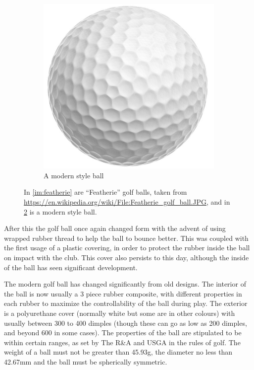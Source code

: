 \begin{figure}[h]
\begin{subfigure}[b]{0.4\textwidth}
\includegraphics[scale=0.48]{../images/golf-itemno-12.jpg}
\caption{A modern style ball}
\label{im:pv1}
\end{subfigure}
\caption[Images of golf balls]{In \ref{im:featherie} are ``Featherie'' golf balls, taken from 
\url{https://en.wikipedia.org/wiki/File:Featherie_golf_ball.JPG}, 
and in \ref{im:pv1} is a modern style ball.}
\end{figure}

After this the golf ball once again changed form with the advent of using wrapped rubber
thread to help the ball to bounce better. This was coupled with the first usage of a plastic 
covering, in order to protect the rubber inside the ball on impact with the
club. This cover also persists to this day, although the inside of the ball has seen significant
development.

The modern golf ball has changed significantly from old designs. The interior of the ball is
now usually a 3 piece rubber composite, with different properties in each rubber to maximize
the controllability of the ball during play. The exterior is a polyurethane cover (normally white
but some are in other colours) with usually between 300 to 400 dimples (though these can go as 
low as 200 dimples, and beyond 600 in some cases). The properties of the ball are stipulated to be
within certain ranges, as set by The R\&A and USGA in the rules of golf. The weight of a ball must
not be greater than 45.93g, the diameter no less than 42.67mm and the ball must be spherically symmetric.

